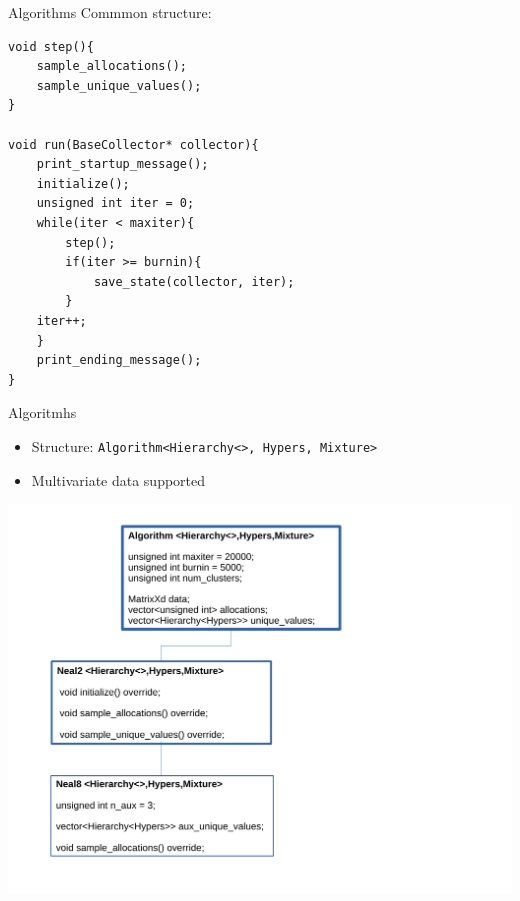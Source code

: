 \begin{frame}[fragile]{Algorithms}
Commmon structure:
\begin{small}
\begin{verbatim}
void step(){
    sample_allocations();
    sample_unique_values();
}

void run(BaseCollector* collector){      
    print_startup_message();
    initialize();
    unsigned int iter = 0;
    while(iter < maxiter){
        step();    
        if(iter >= burnin){
            save_state(collector, iter);
        }
    iter++;
    }
    print_ending_message();
}
\end{verbatim}
\end{small}
\end{frame}

\begin{frame}[fragile]{Algoritmhs} %
\begin{itemize}
	\item Structure: \texttt{Algorithm<Hierarchy<>, Hypers, Mixture>}
	\item Multivariate data supported
\end{itemize}

\begin{center}
	\includegraphics[scale=0.35]{etc/algo.pdf}
\end{center}
\end{frame}


